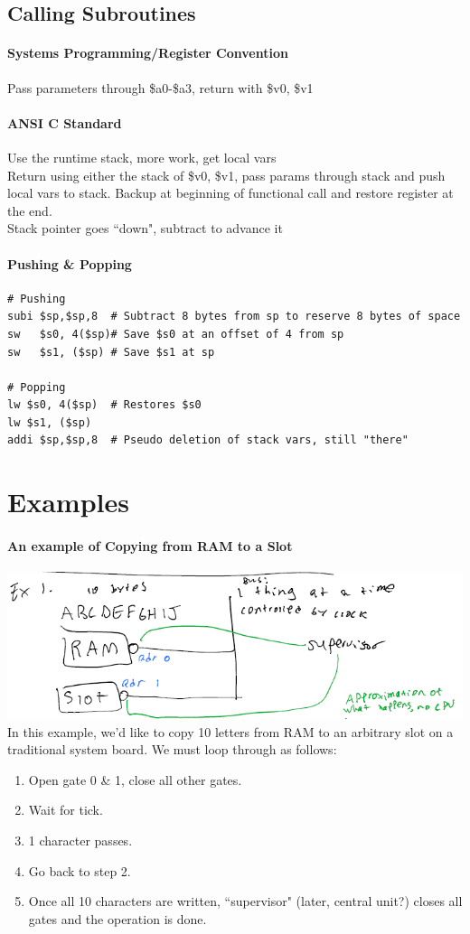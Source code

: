 \documentclass[12 pt]{article}
\begin{document}
\subsection{Calling Subroutines}
\paragraph{Systems Programming/Register Convention}
Pass parameters through \$a0-\$a3, return with \$v0, \$v1
\paragraph{ANSI C Standard} Use the runtime stack, more work, get local vars
\\ Return using either the stack of \$v0, \$v1, pass params through stack and push local vars to stack. Backup at beginning of functional call and restore register at the end.
\\ Stack pointer goes ``down", subtract to advance it
\paragraph{Pushing \& Popping}
\begin{lstlisting}
# Pushing
subi $sp,$sp,8	# Subtract 8 bytes from sp to reserve 8 bytes of space
sw   $s0, 4($sp)# Save $s0 at an offset of 4 from sp 
sw   $s1, ($sp)	# Save $s1 at sp 

# Popping
lw $s0, 4($sp)	# Restores $s0
lw $s1, ($sp)	
addi $sp,$sp,8	# Pseudo deletion of stack vars, still "there"
\end{lstlisting}

\section{Examples}
	\paragraph{An example of Copying from RAM to a Slot}
	\includegraphics[scale=0.5]{rmstr.png}
	In this example, we'd like to copy 10 letters from RAM to an arbitrary slot on a traditional system board. We must loop through as follows:
	\begin{enumerate}
		\item Open gate 0 \& 1, close all other gates.
		\item Wait for tick.
		\item 1 character passes.
		\item Go back to step 2.
		\item Once all 10 characters are written, ``supervisor" (later, central unit?) closes all gates and the operation is done.
		\end{enumerate}
\end{document}
